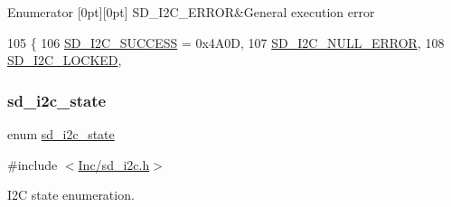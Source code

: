\begin{DoxyEnumFields}{Enumerator}
[0pt][0pt]{}\mbox{\label{group___s_d___i2_c___types_ggae1e3131e61bdef08371262ffb4948a04a8c2d0ed2a4601d3eede97f9c09510bcf}} 
S\+D\+\_\+\+I2\+C\+\_\+\+E\+R\+R\+OR&General execution error \\
\hline

\end{DoxyEnumFields}

\begin{DoxyCode}
105                 \{
106     \mbox{\hyperlink{group___s_d___i2_c___types_ggae1e3131e61bdef08371262ffb4948a04a8ac753d592892daa8d2f9109c59b884b}{SD\_I2C\_SUCCESS}} = 0x4A0D,      
107     \mbox{\hyperlink{group___s_d___i2_c___types_ggae1e3131e61bdef08371262ffb4948a04a6c451bc21bb316eb9e3637e85feb7877}{SD\_I2C\_NULL\_ERROR}},         
108     \mbox{\hyperlink{group___s_d___i2_c___types_ggae1e3131e61bdef08371262ffb4948a04a168b78f5646e80bd09f2f069f1c7b469}{SD\_I2C\_LOCKED}},             
\end{DoxyCode}
\mbox{\label{group___s_d___i2_c___types_gaf9254fee305a19fcc68f616121146552}} 
\subsubsection{\texorpdfstring{sd\+\_\+i2c\+\_\+state}{sd\_i2c\_state}}
{\footnotesize\ttfamily enum \mbox{\hyperlink{group___s_d___i2_c___types_gaf9254fee305a19fcc68f616121146552}{sd\+\_\+i2c\+\_\+state}}}



{\ttfamily \#include $<$\mbox{\hyperlink{sd__i2c_8h}{Inc/sd\+\_\+i2c.\+h}}$>$}



I2C state enumeration. 

